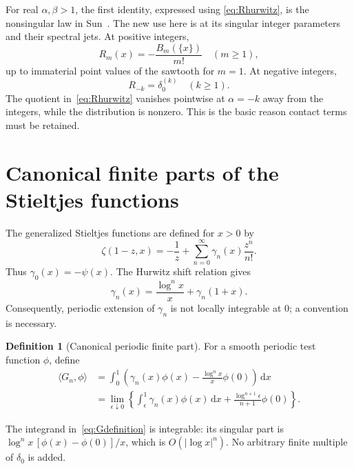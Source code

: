 \documentclass[11pt]{article}
\numberwithin{equation}{section}
\theoremstyle{definition}
\newtheorem{definition}[theorem]{Definition}
\theoremstyle{remark}
\newcommand{\dd}{\,\mathrm d}
\begin{document}
For real $\alpha,\beta>1$, the first identity, expressed using
\eqref{eq:Rhurwitz}, is the nonsingular law in Sun~\cite[Remark 3.2]{Sun}.
The new use here is at its singular integer parameters and their spectral
jets. At positive integers,
\[
 R_m(x)=-\frac{B_m(\{x\})}{m!}\quad(m\ge1),
\]
up to immaterial point values of the sawtooth for $m=1$. At negative
integers,
\begin{equation}\label{eq:negativeR}
 R_{-k}=\delta_0^{(k)}\quad(k\ge1).
\end{equation}
The quotient in~\eqref{eq:Rhurwitz} vanishes pointwise at $\alpha=-k$
away from the integers, while the distribution is nonzero. This is the
basic reason contact terms must be retained.

\section{Canonical finite parts of the Stieltjes functions}
\label{sec:finiteparts}
The generalized Stieltjes functions are defined for $x>0$ by
\begin{equation}\label{eq:laurent}
 \zeta(1-z,x)=-\frac1z+\sum_{n=0}^\infty\gamma_n(x)\frac{z^n}{n!}.
\end{equation}
Thus $\gamma_0(x)=-\psi(x)$. The Hurwitz shift relation gives
\begin{equation}\label{eq:stshift}
 \gamma_n(x)=\frac{\log^n x}{x}+\gamma_n(1+x).
\end{equation}
Consequently, periodic extension of $\gamma_n$ is not locally integrable
at $0$; a convention is necessary.

\begin{definition}[Canonical periodic finite part]\label{def:G}
For a smooth periodic test function $\phi$, define
\begin{align}
 \langle G_n,\phi\rangle
 &=\int_0^1\left(\gamma_n(x)\phi(x)
       -\frac{\log^n x}{x}\phi(0)\right)\dd x\label{eq:Gdefinition}\\
 &=\lim_{\epsilon\downarrow0}\left\{
       \int_\epsilon^1\gamma_n(x)\phi(x)\dd x
       +\frac{\log^{n+1}\epsilon}{n+1}\phi(0)\right\}.
       \label{eq:Gcutoff}
\end{align}
\end{definition}
The integrand in~\eqref{eq:Gdefinition} is integrable: its singular part is
$\log^n x\,[\phi(x)-\phi(0)]/x$, which is $O(|\log x|^n)$.
No arbitrary finite multiple of $\delta_0$ is added.
\end{document}
